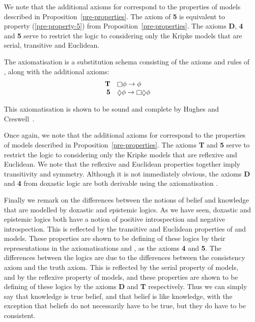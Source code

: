 We note that the additional axioms for \axiomKD{} correspond to the properties
of \classKD{} models described in Proposition~\ref{pre-properties}. The axiom of
{\bf 5} is equivalent to property (\ref{pre-property-5}) from
Proposition~\ref{pre-properties}. The axioms {\bf D}, {\bf 4} and {\bf 5} serve
to restrict the logic to considering only the Kripke models that are serial,
transitive and Euclidean.


\begin{definition}
The axiomatisation \axiomS{} is a substitution schema consisting of the axioms
and rules of \axiomK{}, along with the additional axioms:
$$
\begin{array}{rl}
{\bf T} & \knows \phi \implies \phi\\
{\bf 5} & \suspects \phi \implies \knows \suspects \phi\\
\end{array}
$$
\end{definition}

This axiomatisation is shown to be sound and complete by Hughes and
Creswell~\cite{hughes1996new}.

Once again, we note that the additional axioms for \axiomS{} correspond to the
properties of \classS{} models described in Proposition~\ref{pre-properties}.
The axioms {\bf T} and {\bf 5} serve to restrict the logic to considering only
the Kripke models that are reflexive and Euclidean.  We note that the reflexive
and Euclidean properties together imply transitivity and symmetry. Although it
is not immediately obvious, the axioms {\bf D} and {\bf 4} from doxastic logic
are both derivable using the axiomatisation \axiomS{}.

Finally we remark on the differences between the notions of belief and knowledge
that are modelled by doxastic and epistemic logics. As we have seen, doxastic
and epistemic logics both have a notion of positive introspection and negative
introspection. This is reflected by the transitive and Euclidean properties of
\classKD{} and \classS{} models. These properties are shown to be defining of
these logics by their representations in the axiomatisations \axiomKD{} and
\axiomS{}, as the axioms {\bf 4} and {\bf 5}. The differences between the logics
are due to the differences between the consistency axiom and the truth axiom.
This is reflected by the serial property of \classKD{} models, and by the
reflexive property of \classS{} models, and these properties are shown to be
defining of these logics by the axioms {\bf D} and {\bf T} respectively. Thus we
can simply say that knowledge is true belief, and that belief is like knowledge,
with the exception that beliefs do not necessarily have to be true, but they do
have to be consistent.
